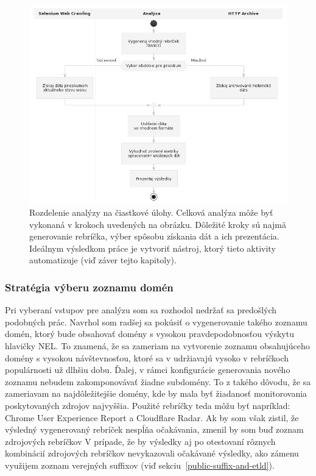 \pagebreak

\begin{figure}[!htb]
\begin{center}
 \includegraphics[scale=0.48]{obrazky-figures/analysis-activity-diagram.png}    
 \caption{\centering Rozdelenie analýzy na čiastkové úlohy. Celková analýza môže byť vykonaná v krokoch uvedených na obrázku. Dôležité kroky sú najmä generovanie rebríčka, výber spôsobu získania dát a ich prezentácia. Ideálnym výsledkom práce je vytvoriť nástroj, ktorý tieto aktivity automatizuje (viď záver tejto kapitoly).}
 \label{img:analysis-activity-diagram}
\end{center}
\end{figure}

\subsubsection{Stratégia výberu zoznamu domén}

Pri vyberaní vstupov pre analýzu som sa rozhodol nedržať sa predošlých podobných prác.
Navrhol som radšej sa pokúsiť o vygenerovanie takého zoznamu domén, ktorý bude obsahovať domény 
s vysokou pravdepodobnosťou výskytu hlavičky NEL. 
To znamená, že sa zameriam na vytvorenie zoznamu obsahujúceho domény s vysokou návštevnosťou, ktoré sa v udržiavajú vysoko v rebríčkoch populárnosti už dlhšiu dobu.
Ďalej, v rámci konfigurácie generovania nového zoznamu nebudem zakomponovávať žiadne subdomény.
To z takého dôvodu, že sa zameriavam na najdôležitejšie domény, kde by mala byť žiadanosť 
monitorovania poskytovaných zdrojov najvyššia.
Použité rebríčky teda môžu byť napríklad: Chrome User Experience Report a Cloudflare Radar.
Ak by som však zistil, že výsledný vygenerovaný rebríček nespĺňa očakávania, zmenil by som buď zoznam zdrojových rebríčkov
V prípade, že by výsledky aj po otestovaní rôznych kombinácií zdrojových rebríčkov nevykazovali očakávané výsledky, ako zámenu využijem zoznam verejných suffixov (viď \mbox{sekciu \ref{public-suffix-and-etld})}.

